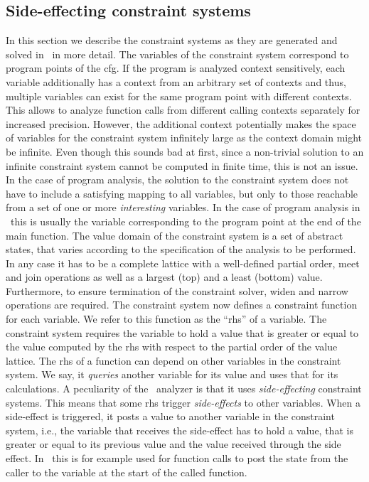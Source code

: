   \subsection{Side-effecting constraint systems}
  \label{sec:background:constrSys}
  In this section we describe the constraint systems as they are generated and solved in \gob\ in more detail. The variables of the constraint system correspond to program points of the \ac{cfg}. If the program is analyzed context sensitively, each variable additionally has a context from an arbitrary set of contexts and thus, multiple variables can exist for the same program point with different contexts. This allows to analyze function calls from different calling contexts separately for increased precision. However, the additional context potentially makes the space of variables for the constraint system infinitely large as the context domain might be infinite. Even though this sounds bad at first, since a non-trivial solution to an infinite constraint system cannot be computed in finite time, this is not an issue. In the case of program analysis, the solution to the constraint system does not have to include a satisfying mapping to all variables, but only to those reachable from a set of one or more \textit{interesting} variables. In the case of program analysis in \gob\ this is usually the variable corresponding to the program point at the end of the main function.
  The value domain of the constraint system is a set of abstract states, that varies according to the specification of the analysis to be performed. In any case it has to be a complete lattice with a well-defined partial order, meet and join operations as well as a largest (top) and a least (bottom) value. Furthermore, to ensure termination of the constraint solver, widen and narrow operations are required.
  The constraint system now defines a constraint function for each variable. We refer to this function as the ``\ac{rhs}'' of a variable. The constraint system requires the variable to hold a value that is greater or equal to the value computed by the \ac{rhs} with respect to the partial order of the value lattice.
  The \ac{rhs} of a function can depend on other variables in the constraint system. We say, it \textit{queries} another variable for its value and uses that for its calculations.
  A peculiarity of the \gob\ analyzer is that it uses \textit{side-effecting} constraint systems. This means that some \ac{rhs} trigger \textit{side-effects} to other variables. When a side-effect is triggered, it posts a value to another variable in the constraint system, i.e., the variable that receives the side-effect has to hold a value, that is greater or equal to its previous value and the value received through the side effect. In \gob\ this is for example used for function calls to post the state from the caller to the variable at the start of the called function.
